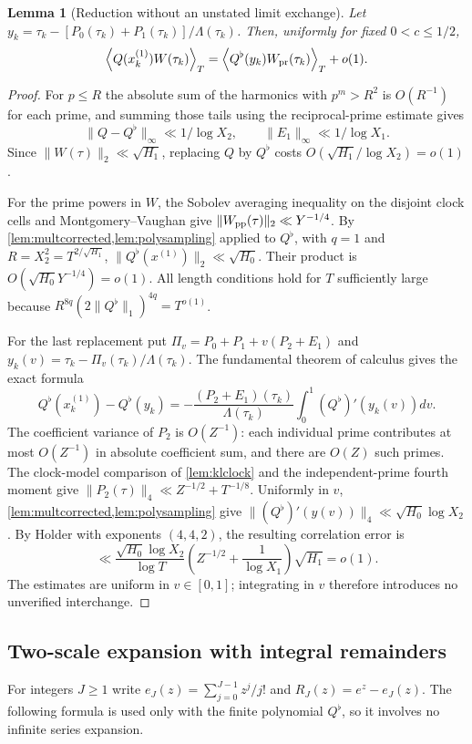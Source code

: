 \documentclass[11pt,reqno]{amsart}
\numberwithin{equation}{section}
\newtheorem{lemma}[theorem]{Lemma}
\newcommand{\av}[1]{\left\langle #1\right\rangle_T}
\begin{document}
\begin{lemma}[Reduction without an unstated limit exchange]
\label{lem:finitecorr}
Let
$y_k=\tau_k-[P_0(\tau_k)+P_1(\tau_k)]/\Lambda(\tau_k)$.
Then, uniformly for fixed $0<c\le1/2$,
\begin{equation}\label{eq:finitecorr}
\av{Q(x_k^{(1)})W(\tau_k)}
=\av{Q^\flat(y_k)W_{\rm pr}(\tau_k)}+o(1).
\end{equation}
\end{lemma}
\begin{proof}
For $p\le R$ the absolute sum of the harmonics with
$p^m>R^2$ is $O(R^{-1})$ for each prime, and summing those tails
using the reciprocal-prime estimate gives
\begin{equation}\label{eq:finiteerrs}
\|Q-Q^\flat\|_\infty\ll1/\log X_2,
\qquad\|E_1\|_\infty\ll1/\log X_1.
\end{equation}
Since $\|W(\tau)\|_2\ll\sqrt{H_1}$, replacing
$Q$ by $Q^\flat$ costs $O(\sqrt{H_1}/\log X_2)=o(1)$.

For the prime powers in $W$, the Sobolev averaging inequality
on the disjoint clock cells and Montgomery--Vaughan give
$\|W_{\rm pp}(\tau)\|_2\ll Y^{-1/4}$.
By \cref{lem:multcorrected,lem:polysampling} applied to
$Q^\flat$, with $q=1$ and $R=X_2^2=T^{2/\sqrt{H_1}}$,
$\|Q^\flat(x^{(1)})\|_2\ll\sqrt{H_0}$.
Their product is $O(\sqrt{H_0}Y^{-1/4})=o(1)$.
All length conditions hold for $T$ sufficiently large because
$R^{8q}(2\|Q^\flat\|_1)^{4q}=T^{o(1)}$.

For the last replacement put
$\Pi_v=P_0+P_1+v(P_2+E_1)$ and
$y_k(v)=\tau_k-\Pi_v(\tau_k)/\Lambda(\tau_k)$.
The fundamental theorem of calculus gives the exact formula
\[
Q^\flat(x^{(1)}_k)-Q^\flat(y_k)
=-\frac{(P_2+E_1)(\tau_k)}{\Lambda(\tau_k)}
\int_0^1(Q^\flat)'(y_k(v))dv.
\]
The coefficient variance of $P_2$ is $O(Z^{-1})$:
each individual prime contributes at most $O(Z^{-1})$ in
absolute coefficient sum, and there are $O(Z)$ such primes.
The clock-model comparison of \cref{lem:klclock} and the
independent-prime fourth moment give
$\|P_2(\tau)\|_4\ll Z^{-1/2}+T^{-1/8}$.
Uniformly in $v$, \cref{lem:multcorrected,lem:polysampling}
give
$\|(Q^\flat)'(y(v))\|_4\ll\sqrt{H_0}\log X_2$.
By Holder with exponents $(4,4,2)$, the resulting correlation
error is
\[
\ll \frac{\sqrt{H_0}\log X_2}{\log T}
\left(Z^{-1/2}+\frac1{\log X_1}\right)\sqrt{H_1}=o(1).
\]
The estimates are uniform in $v\in[0,1]$; integrating in $v$
therefore introduces no unverified interchange.
\end{proof}

\subsection{Two-scale expansion with integral remainders}
For integers $J\ge1$ write
$e_J(z)=\sum_{j=0}^{J-1}z^j/j!$ and
$R_J(z)=e^z-e_J(z)$.
The following formula is used only with the finite polynomial
$Q^\flat$, so it involves no infinite series expansion.
\end{document}
